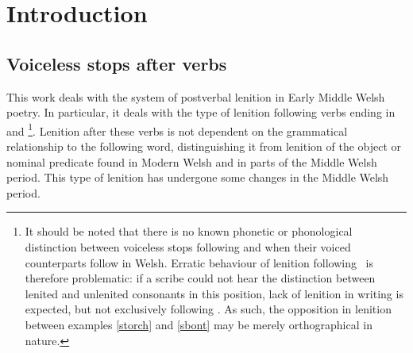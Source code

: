 \chapter{Introduction}
\section{Voiceless stops after verbs}

This work deals with the system of postverbal lenition in Early Middle Welsh poetry. In particular, it deals with the type of lenition following verbs ending in  and \footnote{It should be noted that there is no known phonetic or phonological distinction between voiceless stops following  and when their voiced counterparts follow  in Welsh. Erratic behaviour of lenition following \oes\ is therefore problematic: if a scribe could not hear the distinction between lenited and unlenited consonants in this position, lack of lenition in writing is expected, but not exclusively following \oes. As such, the opposition in lenition between examples \ref{storch} and \ref{sbont} may be merely orthographical in nature.}. Lenition after these verbs is not dependent on the grammatical relationship to the following word, distinguishing it from lenition of the object or nominal predicate found in Modern Welsh and in parts of the Middle Welsh period. This type of lenition has undergone some changes in the Middle Welsh period.

